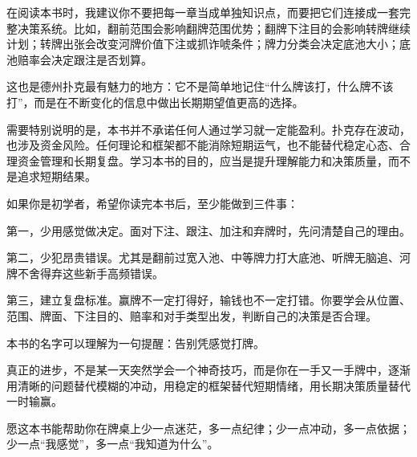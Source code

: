 \documentclass[UTF8,openany,zihao=-4]{ctexbook}
\begin{document}
在阅读本书时，我建议你不要把每一章当成单独知识点，而要把它们连接成一套完整决策系统。比如，翻前范围会影响翻牌范围优势；翻牌下注目的会影响转牌继续计划；转牌出张会改变河牌价值下注或抓诈唬条件；牌力分类会决定底池大小；底池赔率会决定跟注是否划算。

这也是德州扑克最有魅力的地方：它不是简单地记住“什么牌该打，什么牌不该打”，而是在不断变化的信息中做出长期期望值更高的选择。

需要特别说明的是，本书并不承诺任何人通过学习就一定能盈利。扑克存在波动，也涉及资金风险。任何理论和框架都不能消除短期运气，也不能替代稳定心态、合理资金管理和长期复盘。学习本书的目的，应当是提升理解能力和决策质量，而不是追求短期结果。

如果你是初学者，希望你读完本书后，至少能做到三件事：

第一，少用感觉做决定。面对下注、跟注、加注和弃牌时，先问清楚自己的理由。

第二，少犯昂贵错误。尤其是翻前过宽入池、中等牌力打大底池、听牌无脑追、河牌不舍得弃这些新手高频错误。

第三，建立复盘标准。赢牌不一定打得好，输钱也不一定打错。你要学会从位置、范围、牌面、下注目的、赔率和对手类型出发，判断自己的决策是否合理。

本书的名字可以理解为一句提醒：告别凭感觉打牌。

真正的进步，不是某一天突然学会一个神奇技巧，而是你在一手又一手牌中，逐渐用清晰的问题替代模糊的冲动，用稳定的框架替代短期情绪，用长期决策质量替代一时输赢。

愿这本书能帮助你在牌桌上少一点迷茫，多一点纪律；少一点冲动，多一点依据；少一点“我感觉”，多一点“我知道为什么”。

\tableofcontents

\mainmatter












\backmatter

\nocite{*}
\printbibliography[heading=bibintoc,title={参考文献}]
\end{document}
